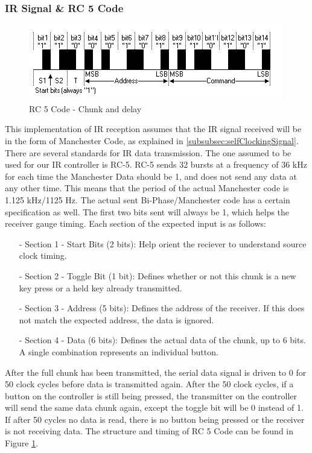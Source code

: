 \documentclass[]{article}
\begin{document}
\subsubsection{IR Signal \& RC 5 Code}
\begin{figure}[H]\centering
    \includegraphics[width=\linewidth]{figures/RC5_Timing.png}
    \caption{RC 5 Code - Chunk and delay \cite{rc5Timing}}
    \label{fig:rc5Code}
\end{figure}
This implementation of IR reception assumes that the IR signal received will be in the form of  Manchester Code, as explained in \ref{subsubsec:selfClockingSignal}.
There are several standards for IR data transmission.
The one assumed to be used for our IR controller is RC-5. RC-5 sends 32 bursts at a frequency of 36 kHz for each time the Manchester Data should be 1, and does not send any data at any other time.
This means that the period of the actual Manchester code is 1.125 kHz/1125 Hz. 
The actual sent Bi-Phase/Manchester code has a certain specification as well. The first two bits sent will always be 1, which helps the receiver gauge timing. Each section of the expected input is as follows:
\begin{itemize}
    \item[-] Section 1 - Start Bits (2 bits): Help orient the reciever to understand source clock timing.
    \item[-] Section 2 - Toggle Bit (1 bit): Defines whether or not this chunk is a new key press or a held key already transmitted.
    \item[-] Section 3 - Address (5 bits): Defines the address of the receiver. If this does not match the expected address, the data is ignored.
    \item[-] Section 4 - Data (6 bits): Defines the actual data of the chunk, up to 6 bits. A single combination represents an individual button.
\end{itemize}
After the full chunk has been transmitted, the serial data signal is driven to 0 for 50 clock cycles before data is transmitted again.
After the 50 clock cycles, if a button on the controller is still being pressed, the transmitter on the controller will send the same data chunk again, except the toggle bit will be 0 instead of 1.
If after 50 cycles no data is read, there is no button being pressed or the receiver is not receiving data.\cite{vishayIr}
The structure and timing of RC 5 Code can be found in Figure \ref{fig:rc5Code}.
\end{document}
